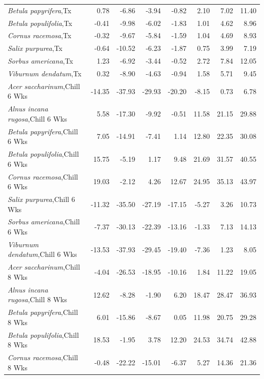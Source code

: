 \documentclass{article}\usepackage[]{graphicx}\usepackage[]{color}
\begin{document}
\begin{longtable}{lrrrrrrr}
  \textit{Betula papyrifera},Tx & 0.78 & -6.86 & -3.94 & -0.82 & 2.10 & 7.02 & 11.40 \\ 
  \textit{Betula populifolia},Tx & -0.41 & -9.98 & -6.02 & -1.83 & 1.01 & 4.62 & 8.96 \\ 
  \textit{Cornus racemosa},Tx & -0.32 & -9.67 & -5.84 & -1.59 & 1.04 & 4.69 & 8.93 \\ 
  \textit{Salix purpurea},Tx & -0.64 & -10.52 & -6.23 & -1.87 & 0.75 & 3.99 & 7.19 \\ 
  \textit{Sorbus americana},Tx & 1.23 & -6.92 & -3.44 & -0.52 & 2.72 & 7.84 & 12.05 \\ 
  \textit{Viburnum dendatum},Tx & 0.32 & -8.90 & -4.63 & -0.94 & 1.58 & 5.71 & 9.45 \\ 
  \textit{Acer saccharinum},Chill 6 Wks & -14.35 & -37.93 & -29.93 & -20.20 & -8.15 & 0.73 & 6.78 \\ 
  \textit{Alnus incana rugosa},Chill 6 Wks & 5.58 & -17.30 & -9.92 & -0.51 & 11.58 & 21.15 & 29.88 \\ 
  \textit{Betula papyrifera},Chill 6 Wks & 7.05 & -14.91 & -7.41 & 1.14 & 12.80 & 22.35 & 30.08 \\ 
  \textit{Betula populifolia},Chill 6 Wks & 15.75 & -5.19 & 1.17 & 9.48 & 21.69 & 31.57 & 40.55 \\ 
  \textit{Cornus racemosa},Chill 6 Wks & 19.03 & -2.12 & 4.26 & 12.67 & 24.95 & 35.13 & 43.97 \\ 
  \textit{Salix purpurea},Chill 6 Wks & -11.32 & -35.50 & -27.19 & -17.15 & -5.27 & 3.26 & 10.73 \\ 
  \textit{Sorbus americana},Chill 6 Wks & -7.37 & -30.13 & -22.39 & -13.16 & -1.33 & 7.13 & 14.13 \\ 
  \textit{Viburnum dendatum},Chill 6 Wks & -13.53 & -37.93 & -29.45 & -19.40 & -7.36 & 1.23 & 8.05 \\ 
  \textit{Acer saccharinum},Chill 8 Wks & -4.04 & -26.53 & -18.95 & -10.16 & 1.84 & 11.22 & 19.05 \\ 
  \textit{Alnus incana rugosa},Chill 8 Wks & 12.62 & -8.28 & -1.90 & 6.20 & 18.47 & 28.47 & 36.93 \\ 
  \textit{Betula papyrifera},Chill 8 Wks & 6.01 & -15.86 & -8.67 & 0.05 & 11.98 & 20.75 & 29.28 \\ 
  \textit{Betula populifolia},Chill 8 Wks & 18.53 & -1.95 & 3.78 & 12.20 & 24.53 & 34.74 & 42.88 \\ 
  \textit{Cornus racemosa},Chill 8 Wks & -0.48 & -22.22 & -15.01 & -6.37 & 5.27 & 14.36 & 21.36 \\ 

\end{longtable}
\end{document}
